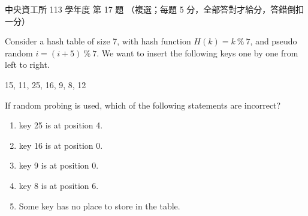 \begin{pastexam}[label={px:ncu-113-dsa-17}]{中央資工所 113 學年度 第 17 題}
（複選；每題 5 分，全部答對才給分，答錯倒扣一分）

Consider a hash table of size 7, with hash function $H(k)=k\ \%\ 7$, and pseudo random $i=(i+5)\ \%\ 7$. We
want to insert the following keys one by one from left to right.

15, 11, 25, 16, 9, 8, 12

If random probing is used, which of the following statements are incorrect?
\begin{enumerate}[label=(\Alph*)]
\item key 25 is at position 4.
\item key 16 is at position 0.
\item key 9 is at position 0.
\item key 8 is at position 6.
\item Some key has no place to store in the table.
\end{enumerate}
\end{pastexam}

